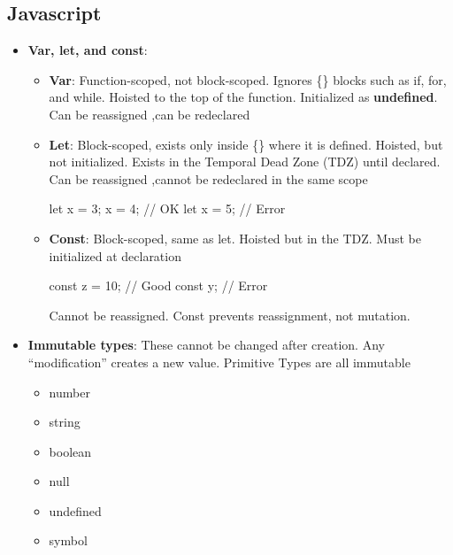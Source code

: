 \documentclass{report}
\begin{document}
    \subsection{Javascript}
    \begin{itemize}
        \item \textbf{Var, let, and const}:  
            \begin{itemize}
                \item \textbf{Var}: Function-scoped, not block-scoped. Ignores \{\} blocks such as if, for, and while. Hoisted to the top of the function. Initialized as \textbf{undefined}. Can be reassigned ,can be redeclared
                \item \textbf{Let}: Block-scoped, exists only inside \{\} where it is defined. Hoisted, but not initialized. Exists in the Temporal Dead Zone (TDZ) until declared. Can be reassigned ,cannot be redeclared in the same scope
                    \bigbreak \noindent 
                    \begin{jscode}
                        let x = 3;
                        x = 4;     // OK
                        let x = 5; // Error
                    \end{jscode}
                \item \textbf{Const}: Block-scoped, same as let. Hoisted but in the TDZ. Must be initialized at declaration
                    \bigbreak \noindent 
                    \begin{jscode}
                    const z  = 10; // Good
                    const y;       // Error
                    \end{jscode}
                    \bigbreak \noindent 
                    Cannot be reassigned. Const prevents reassignment, not mutation.
            \end{itemize}
                \item \textbf{Immutable types}: These cannot be changed after creation. Any “modification” creates a new value. Primitive Types are all immutable 
                    \begin{itemize}
                        \item number	
                        \item string
                        \item boolean
                        \item null	
                        \item undefined	
                        \item symbol

\end{itemize}
\end{itemize}
\end{document}
